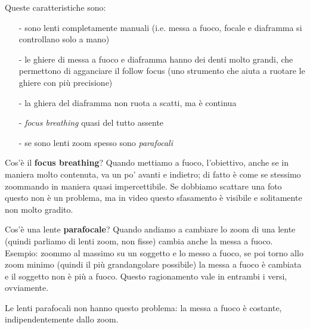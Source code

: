 Queste caratteristiche sono:
\begin{itemize}
    \item[-] sono lenti completamente manuali (i.e. messa a fuoco, focale e diaframma si controllano solo a mano)
    \item[-] le ghiere di messa a fuoco e diaframma hanno dei denti molto grandi, che permettono di agganciare il follow focus (uno strumento che aiuta a ruotare le ghiere con più precisione)
    \item[-] la ghiera del diaframma non ruota a scatti, ma è continua
    \item[-] \textit{focus breathing} quasi del tutto assente
    \item[-] se sono lenti zoom spesso sono \textit{parafocali}
\end{itemize}

Cos'è il \textbf{focus breathing}?
Quando mettiamo a fuoco, l'obiettivo, anche se in maniera molto contenuta, va un po' avanti e indietro; di fatto è come se stessimo zoommando in maniera quasi impercettibile.
Se dobbiamo scattare una foto questo non è un problema, ma in video questo sfasamento è visibile e solitamente non molto gradito.

Cos'è una lente \textbf{parafocale}?
Quando andiamo a cambiare lo zoom di una lente (quindi parliamo di lenti zoom, non fisse) cambia anche la messa a fuoco.
Esempio: zoommo al massimo su un soggetto e lo messo a fuoco, se poi torno allo zoom minimo (quindi il più grandangolare possibile) la messa a fuoco è cambiata e il soggetto non è più a fuoco.
Questo ragionamento vale in entrambi i versi, ovviamente.

Le lenti parafocali non hanno questo problema: la messa a fuoco è costante, indipendentemente dallo zoom.

